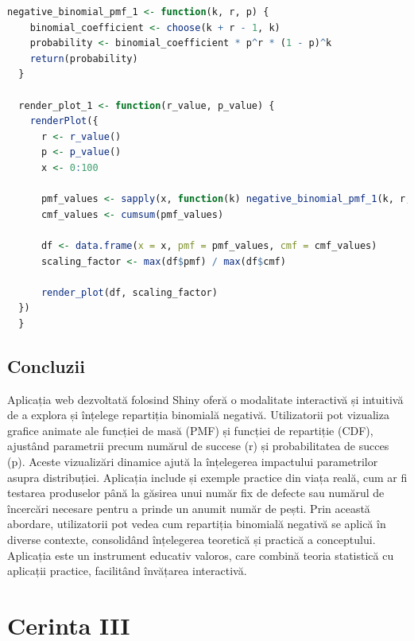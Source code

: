 \documentclass[a4paper,11pt]{article}
\begin{document}
\begin{lstlisting}[language=R]
  negative_binomial_pmf_1 <- function(k, r, p) {
    binomial_coefficient <- choose(k + r - 1, k)
    probability <- binomial_coefficient * p^r * (1 - p)^k
    return(probability)
  }
  
  render_plot_1 <- function(r_value, p_value) {
    renderPlot({
      r <- r_value()
      p <- p_value()
      x <- 0:100
  
      pmf_values <- sapply(x, function(k) negative_binomial_pmf_1(k, r, p))
      cmf_values <- cumsum(pmf_values)
  
      df <- data.frame(x = x, pmf = pmf_values, cmf = cmf_values)
      scaling_factor <- max(df$pmf) / max(df$cmf)
  
      render_plot(df, scaling_factor)
  })
  }
\end{lstlisting}

\subsection*{Concluzii}

Aplicația web dezvoltată folosind Shiny oferă o modalitate interactivă și intuitivă de a explora și înțelege repartiția binomială negativă. Utilizatorii pot vizualiza grafice animate ale funcției de masă (PMF) și funcției de repartiție (CDF), ajustând parametrii precum numărul de succese (r) și probabilitatea de succes (p). Aceste vizualizări dinamice ajută la înțelegerea impactului parametrilor asupra distribuției. Aplicația include și exemple practice din viața reală, cum ar fi testarea produselor până la găsirea unui număr fix de defecte sau numărul de încercări necesare pentru a prinde un anumit număr de pești. Prin această abordare, utilizatorii pot vedea cum repartiția binomială negativă se aplică în diverse contexte, consolidând înțelegerea teoretică și practică a conceptului. Aplicația este un instrument educativ valoros, care combină teoria statistică cu aplicații practice, facilitând învățarea interactivă.







\newpage

\section*{Cerinta III}
\end{document}
